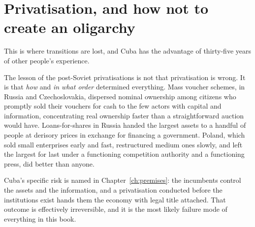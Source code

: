 \section{Privatisation, and how not to create an oligarchy}

This is where transitions are lost, and Cuba has the advantage of thirty-five
years of other people's experience.

The lesson of the post-Soviet privatisations is not that privatisation is wrong.
It is that \emph{how} and \emph{in what order} determined everything. Mass voucher
schemes, in Russia and Czechoslovakia, dispersed nominal ownership among citizens
who promptly sold their vouchers for cash to the few actors with capital and
information, concentrating real ownership faster than a straightforward auction
would have. Loans-for-shares in Russia handed the largest assets to a handful of
people at derisory prices in exchange for financing a government. Poland, which
sold small enterprises early and fast, restructured medium ones slowly, and left
the largest for last under a functioning competition authority and a functioning
press, did better than anyone.

Cuba's specific risk is named in Chapter~\ref{ch:premises}: the incumbents
control the assets and the information, and a privatisation conducted before the
institutions exist hands them the economy with legal title attached. That outcome
is effectively irreversible, and it is the most likely failure mode of everything
in this book.

